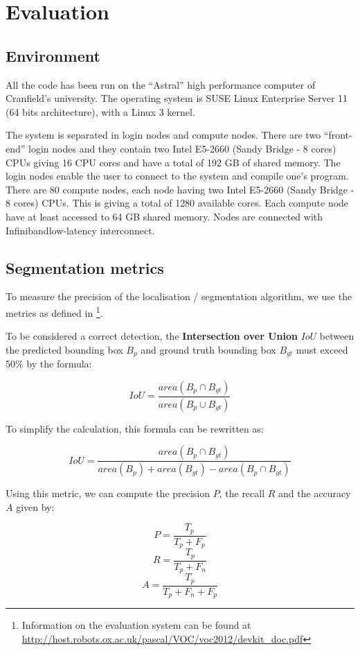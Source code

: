 \chapter{Evaluation} \label{sec:evaluation}

\section{Environment}

All the code has been run on the \enquote{Astral} high performance computer of Cranfield's university. The operating system is SUSE Linux Enterprise Server 11 (64 bits architecture), with a Linux 3 kernel.

The system is separated in login nodes and compute nodes. There are two \enquote{front-end} login nodes and they contain two Intel E5-2660 (Sandy Bridge - 8 cores) CPUs giving 16 CPU cores and have a total of 192 GB of shared memory. The login nodes enable the user to connect to the system and compile one's program. There are 80 compute nodes, each node having two Intel E5-2660 (Sandy Bridge - 8 cores) CPUs. This is giving a total of 1280 available cores. Each compute node have at least accessed to 64 GB shared memory. Nodes are connected with Infiniband\TM low-latency interconnect.

\section{Segmentation metrics}

To measure the precision of the localisation / segmentation algorithm, we use the metrics as defined in \cite{pascalVoc2012} \footnote{Information on the evaluation system can be found at  \url{http://host.robots.ox.ac.uk/pascal/VOC/voc2012/devkit_doc.pdf}}.

To be considered a correct detection, the \textbf{Intersection over Union} $IoU$ between the predicted bounding box $B_p$ and ground truth bounding box $B_{gt}$ must exceed 50\% by the formula:

$$IoU = \frac{area(B_p \cap B_{gt})}{area(B_p \cup B_{gt})}$$

To simplify the calculation, this formula can be rewritten as:

$$IoU = \frac{area(B_p \cap B_{gt})}{area(B_p) + area(B_{gt}) - area(B_p \cap B_{gt})} $$

Using this metric, we can compute the precision $P$, the recall $R$ and the accuracy $A$ given by:

$$ P =  \frac{T_p}{T_p + F_p}$$
$$ R =  \frac{T_p}{T_p + F_n}$$
$$ A = \frac{T_p}{T_p + F_n + F_p} $$

